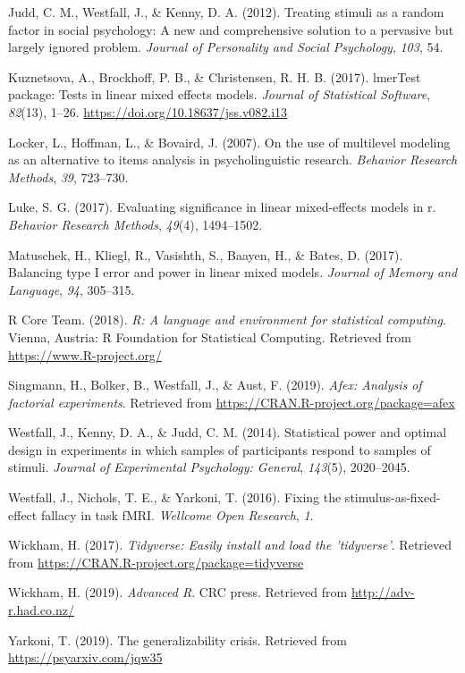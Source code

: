 \documentclass[
  english,
  doc,floatsintext]{apa6}
\begin{document}
\leavevmode\hypertarget{ref-judd_westfall_kenny_2012}{}%
Judd, C. M., Westfall, J., \& Kenny, D. A. (2012). Treating stimuli as a random factor in social psychology: A new and comprehensive solution to a pervasive but largely ignored problem. \emph{Journal of Personality and Social Psychology}, \emph{103}, 54.

\leavevmode\hypertarget{ref-R-lmerTest}{}%
Kuznetsova, A., Brockhoff, P. B., \& Christensen, R. H. B. (2017). lmerTest package: Tests in linear mixed effects models. \emph{Journal of Statistical Software}, \emph{82}(13), 1--26. \url{https://doi.org/10.18637/jss.v082.i13}

\leavevmode\hypertarget{ref-locker_hoffman_bovaird_2007}{}%
Locker, L., Hoffman, L., \& Bovaird, J. (2007). On the use of multilevel modeling as an alternative to items analysis in psycholinguistic research. \emph{Behavior Research Methods}, \emph{39}, 723--730.

\leavevmode\hypertarget{ref-luke-2017}{}%
Luke, S. G. (2017). Evaluating significance in linear mixed-effects models in r. \emph{Behavior Research Methods}, \emph{49}(4), 1494--1502.

\leavevmode\hypertarget{ref-matuschek_et_al_2017}{}%
Matuschek, H., Kliegl, R., Vasishth, S., Baayen, H., \& Bates, D. (2017). Balancing type I error and power in linear mixed models. \emph{Journal of Memory and Language}, \emph{94}, 305--315.

\leavevmode\hypertarget{ref-R-base}{}%
R Core Team. (2018). \emph{R: A language and environment for statistical computing}. Vienna, Austria: R Foundation for Statistical Computing. Retrieved from \url{https://www.R-project.org/}

\leavevmode\hypertarget{ref-R-afex}{}%
Singmann, H., Bolker, B., Westfall, J., \& Aust, F. (2019). \emph{Afex: Analysis of factorial experiments}. Retrieved from \url{https://CRAN.R-project.org/package=afex}

\leavevmode\hypertarget{ref-westfall_2014}{}%
Westfall, J., Kenny, D. A., \& Judd, C. M. (2014). Statistical power and optimal design in experiments in which samples of participants respond to samples of stimuli. \emph{Journal of Experimental Psychology: General}, \emph{143}(5), 2020--2045.

\leavevmode\hypertarget{ref-westfall_yarkoni_2016}{}%
Westfall, J., Nichols, T. E., \& Yarkoni, T. (2016). Fixing the stimulus-as-fixed-effect fallacy in task fMRI. \emph{Wellcome Open Research}, \emph{1}.

\leavevmode\hypertarget{ref-R-tidyverse}{}%
Wickham, H. (2017). \emph{Tidyverse: Easily install and load the 'tidyverse'}. Retrieved from \url{https://CRAN.R-project.org/package=tidyverse}

\leavevmode\hypertarget{ref-wickham-advr}{}%
Wickham, H. (2019). \emph{Advanced R}. CRC press. Retrieved from \url{http://adv-r.had.co.nz/}

\leavevmode\hypertarget{ref-yarkoni-GC}{}%
Yarkoni, T. (2019). The generalizability crisis. Retrieved from \url{https://psyarxiv.com/jqw35}

\endgroup
\end{document}
